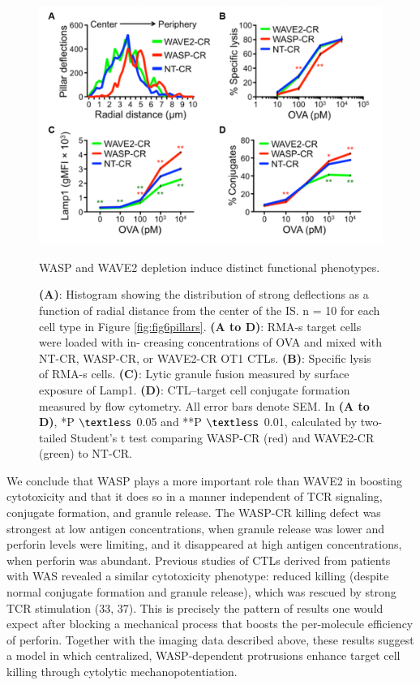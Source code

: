 \begin{figure}[htbp]
	\centering
	\includegraphics[width=\textwidth]{../figures/chapter2/fig6crisprs.png}
	\caption{WASP and WAVE2 depletion induce distinct functional phenotypes.}
	\caption*{\textbf{(A)}: Histogram showing the distribution of strong deflections as a function of radial distance from the center of the IS. n = 10 for each cell type in Figure \ref{fig:fig6pillars}. \textbf{(A to D)}: RMA-s target cells were loaded with in- creasing concentrations of OVA and mixed with NT-CR, WASP-CR, or WAVE2-CR OT1 CTLs. \textbf{(B)}: Specific lysis of RMA-s cells. \textbf{(C)}: Lytic granule fusion measured by surface exposure of Lamp1. \textbf{(D)}: CTL–target cell conjugate formation measured by flow cytometry. All error bars denote SEM. In \textbf{(A to D)}, *P $\textless$ 0.05 and **P $\textless$ 0.01, calculated by two-tailed Student’s t test comparing WASP-CR (red) and WAVE2-CR (green) to NT-CR.}
	\label{fig:fig6crisprs}
\end{figure}

We conclude that WASP plays a more important role than WAVE2 in boosting cytotoxicity and that it does so in a manner independent of TCR signaling, conjugate formation, and granule release. The WASP-CR killing defect was strongest at low antigen concentrations, when granule release was lower and perforin levels were limiting, and it disappeared at high antigen concentrations, when perforin was abundant. Previous studies of CTLs derived from patients with WAS revealed a similar cytotoxicity phenotype: reduced killing (despite normal conjugate formation and granule release), which was rescued by strong TCR stimulation (33, 37). This is precisely the pattern of results one would expect after blocking a mechanical process that boosts the per-molecule efficiency of perforin. Together with the imaging data described above, these results suggest a model in which centralized, WASP-dependent protrusions enhance target cell killing through cytolytic mechanopotentiation.

